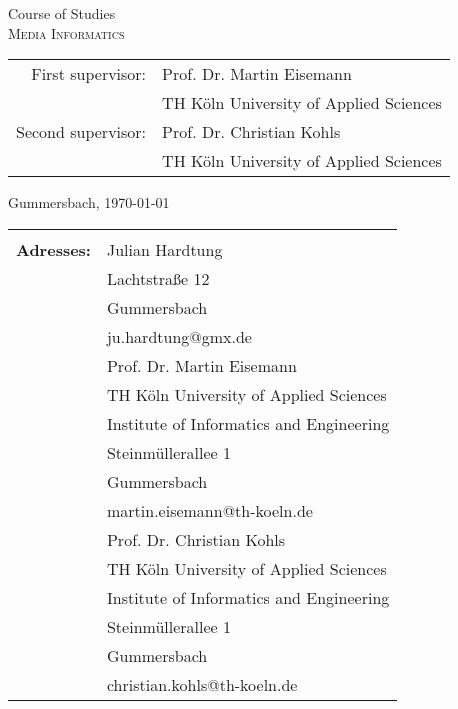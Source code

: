 \begin{titlepage}
\begin{center}
		\vspace{0.4cm}
		
		\begin{large}
			Course of Studies\\ 
			\vspace{0.2cm}
			\textsc{Media Informatics}
		\end{large}
		
		\vspace{1.0cm}
		
		\begin{tabular}{rl}
			First supervisor: 	& Prof. Dr. Martin Eisemann\\
						& \small TH Köln University of Applied Sciences\\[1.0em]
			Second supervisor: 	& Prof. Dr. Christian Kohls\\
						& \small TH Köln University of Applied Sciences
		\end{tabular}
		
		\vspace{0.6cm}
		
		\begin{large}
			Gummersbach, \today
		\end{large}
	\end{center}
		
	\newpage
	\thispagestyle{empty}
		
		
	\begin{center}
		\begin{tabular}{rl}
						&  \\[27.0em]
									
		\large \textbf{Adresses:}	&  	\quad Julian Hardtung\\
						&  	\quad Lachtstraße 12 \\
						&	\quad 51645 Gummersbach\\
						&  	\quad ju.hardtung@gmx.de\\[2.0em]
									
						&  	\quad Prof. Dr. Martin Eisemann\\
						&  	\quad TH Köln University of Applied Sciences\\
						&  	\quad Institute of Informatics and Engineering\\
						&	\quad Steinmüllerallee 1\\
						&	\quad 51643 Gummersbach\\
						&  	\quad martin.eisemann@th-koeln.de\\[2.0em]
									
						&  	\quad Prof. Dr. Christian Kohls\\
						&  	\quad TH Köln University of Applied Sciences\\
						&  	\quad Institute of Informatics and Engineering\\
						&	\quad Steinmüllerallee 1\\
						&	\quad 51643 Gummersbach\\
						&  	\quad christian.kohls@th-koeln.de\\[2.0em]
		\end{tabular}
	\end{center}

\end{titlepage}
